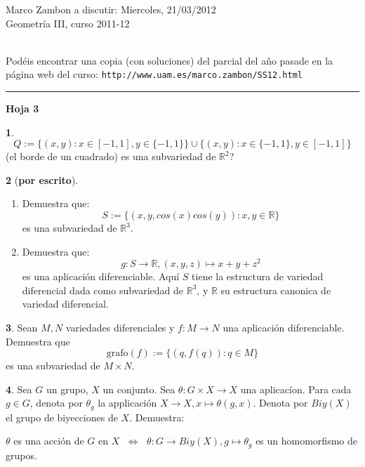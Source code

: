 \documentclass[12pt,a4paper]{report}
\theoremstyle{definition}
\newtheorem{ex}{}
\newcommand{\RR}{\ensuremath{\mathbb R}}
\begin{document}
\noindent
{\sffamily\large Marco Zambon 
\hfill   a discutir:   Miercoles, 21/03/2012\\Geometr\'ia III, curso 2011-12}
 

\noindent
\hrulefill{}\\
Pod\'eis encontrar una copia (con soluciones) del parcial del a\~no pasade en la p\'agina web del curso: \texttt{http://www.uam.es/marco.zambon/SS12.html}\\
\hrule

\begin{center}\bfseries\large\textsf{Hoja 3    \vspace{-2mm}}
\end{center}

\noindent
 
\begin{ex}
$$Q:=\{(x,y):x\in[-1,1], y\in\{-1,1\}\}\cup \{(x,y): x\in\{-1,1\},y\in[-1,1]\}$$
(el borde de un cuadrado) es  una subvariedad de $\RR^2$?
\end{ex} 
 
\begin{ex}[{\bf por escrito}]


\begin{enumerate}
\item Demuestra que: $$S:=\{(x,y,cos(x)cos(y)): x,y \in \RR\}$$
es una subvariedad de $\RR^3$. 
\item Demuestra que: $$g \colon S \to \RR, (x,y,z) \mapsto x+y+z^2$$
es una aplicaci\'on diferenciable. Aqu\'i   $S$ tiene  la estructura de variedad diferencial dada como subvariedad de  $\RR^3$, y $\RR$ su estructura canonica  de variedad diferencial.
\end{enumerate}

\end{ex}


\begin{ex}
Sean $M, N$ variedades diferenciales y $f \colon M\to N$ una aplicaci\'on diferenciable. Demuestra que 
$$\text{grafo}(f):=\{(q,f(q)):q\in M\}$$
es una subvariedad de $M\times N$.
\end{ex}




\begin{ex} Sea $G$ un grupo, $X$ un conjunto. Sea $\theta \colon G \times X \to X$ una aplicac\'ion. Para cada $g\in G$, denota por $\theta_g$ la applicaci\'on $X \to X, x \mapsto \theta(g,x)$. Denota por $Biy(X)$ el grupo de biyecciones de $X$. Demuestra:

\noindent $\theta$ es una acci\'on de $G$ en $X$ $\;\Leftrightarrow\;$   $\theta \colon G \to Biy(X), g \mapsto \theta_g$ es un homomorfismo de grupos. 

\end{ex}
\end{document}

